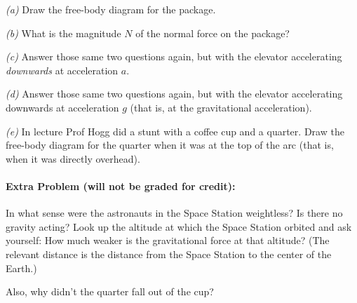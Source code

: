 \documentclass[12pt]{article}
\begin{document}
\textsl{(a)} Draw the free-body diagram for the package.

\textsl{(b)} What is the magnitude $N$ of the normal force on the
package?

\textsl{(c)} Answer those same two questions again, but with the
elevator accelerating \emph{downwards} at acceleration $a$.

\textsl{(d)} Answer those same two questions again, but with the
elevator accelerating downwards at acceleration $g$ (that is, at
the gravitational acceleration).

\textsl{(e)} In lecture Prof Hogg did a stunt with a coffee cup and a
quarter. Draw the free-body diagram for the quarter when it was at the
top of the arc (that is, when it was directly overhead).

\paragraph{Extra Problem (will not be graded for credit):}%
In what sense were the astronauts in the Space Station weightless? Is
there no gravity acting? Look up the altitude at which the Space
Station orbited and ask yourself: How much weaker is the gravitational
force at that altitude? (The relevant distance is the distance from
the Space Station to the center of the Earth.)

Also, why didn't the quarter fall out of the cup?
\end{document}

